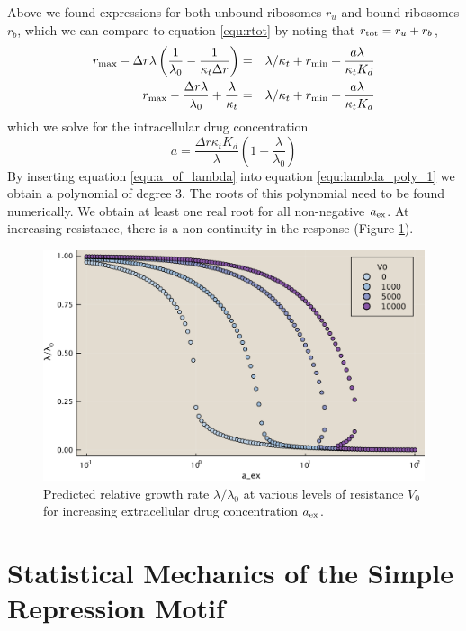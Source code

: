  Above we found expressions for both unbound ribosomes $r_u$ and bound ribosomes $r_b$, which we can compare to equation \ref{equ:rtot} by noting that $r_{\mathrm{tot}} = r_u + r_b$,
\begin{eqnarray}
    r_{\mathrm{max}} - \Delta r\lambda \left( \frac{1}{\lambda_0} - \frac{1}{\kappa_t \Delta r} \right) &=& \lambda/\kappa_t + r_{\mathrm{min}} + {a\lambda\ \over \kappa_t K_d} \nonumber\\
    r_{\mathrm{max}} - \frac{\Delta r\lambda}{\lambda_0} + \frac{\lambda}{\kappa_t }  &=& \lambda/\kappa_t + r_{\mathrm{min}} + {a\lambda\ \over \kappa_t K_d} \nonumber
\end{eqnarray}
which we solve for the intracellular drug concentration
\begin{equation}
    a = \frac{\Delta r \kappa_t K_d}{\lambda}\left( 1-\frac{\lambda}{\lambda_0} \right)\label{equ:a_of_lambda}
\end{equation}
By inserting equation \ref{equ:a_of_lambda} into equation \ref{equ:lambda_poly_1} we obtain a polynomial of degree 3. The roots of this polynomial need to be found numerically. We obtain at least one real root for all non-negative $a_{\mathrm{ex}}$. At increasing resistance, there is a non-continuity in the response (Figure \ref{fig:model_res}).

\begin{figure}
    \centering
    \includegraphics[width=.7\linewidth]{res_model_edit.pdf}
    \caption{Predicted relative growth rate $\lambda/\lambda_0$ at various levels of resistance $V_0$ for increasing extracellular drug concentration $a_{\mathrm{ex}}$.}
    \label{fig:model_res}
\end{figure}
\section{Statistical Mechanics of the Simple Repression Motif}
\label{sec:gene_expression}
